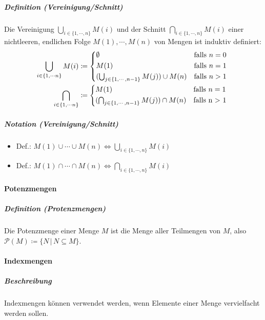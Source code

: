 \documentclass[a4paper, 11pt, accentcolor = tud3b]{tudreport}
\newcommand{\forwhich}{\ensuremath{{\,\vert\,}}}
\newcommand{\definition}[2]{\subparagraph{Definition (#1)} #2}
\newcommand{\notation}[2]{\subparagraph{Notation (#1)} #2}
\begin{document}
			    \definition{Vereinigung/Schnitt}{
				    Die Vereinigung $ \bigcup _ { i \in \{ 1, \cdots, n \} } M(i) $ und der Schnitt $ \bigcap _ { i \in \{ 1, \cdots, n \} } M(i) $ einer nichtleeren, endlichen Folge $ M(1), \cdots, M(n) $ von Mengen ist induktiv definiert:
				    \begin{align*}
					    \bigcup _ { i \in \{ 1, \cdots n \} } M(i) &\coloneqq \begin{cases*}
						    \emptyset & \text{falls $ n = 0 $} \\
						    M(1) & \text{falls $ n = 1 $} \\
						    (\bigcup _ { j \in \{ 1, \cdots, n - 1 \} } M(j)) \cup M(n) & \text{falls $ n > 1 $} \\
					    \end{cases*} \\
					    \bigcap _ { i \in \{ 1, \cdots n \} } &\coloneqq \begin{cases*}
						    M(1) & \text{falls $ n = 1 $} \\
						    (\bigcap _ { j \in \{ 1, \cdots, n - 1 \} } M(j)) \cap M(n) & \text{falls n > 1} \\
					    \end{cases*} \\
				    \end{align*}
				}
			    
			    \notation{Vereinigung/Schnitt}{
				    \begin{itemize}
				    	\item Def.: $ M(1) \cup \cdots \cup M(n) \iff \bigcup _ { i \in \{ 1, \cdots, n \} } M(i) $
				    	\item Def.: $ M(1) \cap \cdots \cap M(n) \iff \bigcap _ { i \in \{ 1, \cdots, n \} } M(i) $
				    \end{itemize}
				}
		    
		    \paragraph{Potenzmengen}
			    \definition{Protenzmengen}{Die Potenzmenge einer Menge $ M $ ist die Menge aller Teilmengen von $ M $, also $ \mathcal{P}(M) \coloneqq \{ N \forwhich N \subseteq M \} $.}
		    
		    \paragraph{Indexmengen}
			    \subparagraph{Beschreibung}
			    Indexmengen können verwendet werden, wenn Elemente einer Menge vervielfacht werden sollen.
			    
\end{document}
